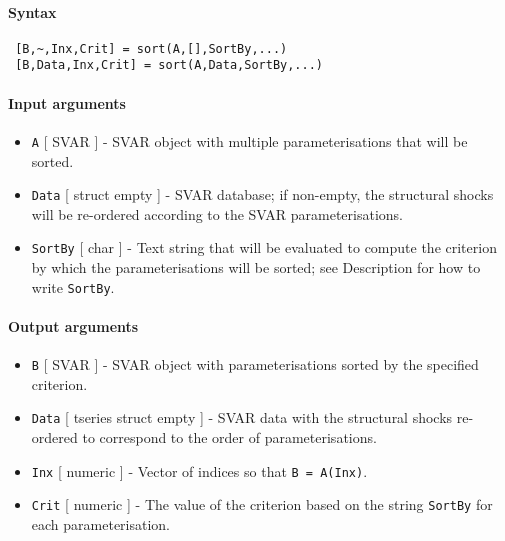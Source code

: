 


	\paragraph{Syntax}
 
 \begin{verbatim}
 [B,~,Inx,Crit] = sort(A,[],SortBy,...)
 [B,Data,Inx,Crit] = sort(A,Data,SortBy,...)
 \end{verbatim}
 
 \paragraph{Input arguments}
 
 \begin{itemize}
 \item
   \texttt{A} {[} SVAR {]} - SVAR object with multiple parameterisations
   that will be sorted.
 \item
   \texttt{Data} {[} struct \textbar{} empty {]} - SVAR database; if
   non-empty, the structural shocks will be re-ordered according to the
   SVAR parameterisations.
 \item
   \texttt{SortBy} {[} char {]} - Text string that will be evaluated to
   compute the criterion by which the parameterisations will be sorted;
   see Description for how to write \texttt{SortBy}.
 \end{itemize}
 
 \paragraph{Output arguments}
 
 \begin{itemize}
 \item
   \texttt{B} {[} SVAR {]} - SVAR object with parameterisations sorted by
   the specified criterion.
 \item
   \texttt{Data} {[} tseries \textbar{} struct \textbar{} empty {]} -
   SVAR data with the structural shocks re-ordered to correspond to the
   order of parameterisations.
 \item
   \texttt{Inx} {[} numeric {]} - Vector of indices so that
   \texttt{B = A(Inx)}.
 \item
   \texttt{Crit} {[} numeric {]} - The value of the criterion based on
   the string \texttt{SortBy} for each parameterisation.
 \end{itemize}
 
